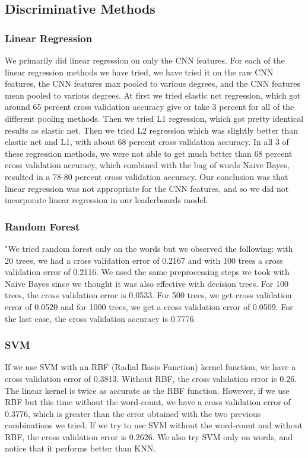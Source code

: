 \documentclass[11pt,twocolumn]{report}
\begin{document}
    
    \subsection*{Discriminative Methods}
    \subsubsection{Linear Regression}
	We primarily did linear regression on only the CNN features. For each of the linear regression methods we have tried, we have tried it on the raw CNN features, the CNN features max pooled to various degrees, and the CNN features mean pooled to various degrees.    
    At first we tried elastic net regression, which got around 65 percent cross validation accuracy give or take 3 percent for all of the different pooling methods. Then we tried L1 regression, which got pretty identical results as elastic net. Then we tried L2 regression which was slightly better than elastic net and L1, with about 68 percent cross validation accuracy. 
    In all 3 of these regression methods, we were not able to get much better than 68 percent cross validation accuracy, which combined with the bag of words Naive Bayes, resulted in a 78-80 percent cross validation accuracy. Our conclusion was that linear regression was not appropriate for the CNN features, and so we did not incorporate linear regression in our leaderboards model. 
    
     \subsubsection{Random Forest}
     "We tried random forest only on the words but we observed the following: with 20 trees, we had a cross validation error of 0.2167 and with 100 trees a cross validation error of 0.2116. We used the same preprocessing steps we took with Naive Bayes since we thought it was also effective with decision trees. 
     For 100 trees, the cross validation error is 0.0533. For 500 trees, we get cross validation error of 0.0520 and for 1000 trees, we get a cross validation error of 0.0509. For the last case, the cross validation accuracy is 0.7776.
    \subsubsection{SVM}
    
    If we use SVM with an RBF (Radial Basis Function) kernel function, we have a cross validation error of 0.3813. Without RBF, the cross validation error is 0.26. The linear kernel is twice as accurate as the RBF function. However, if we use RBF but this time without the word-count, we have a cross validation error of 0.3776, which is greater than the error obtained with the two previous combinations we tried. If we try to use SVM without the word-count and without RBF, the cross validation error is 0.2626. We also try SVM only on words, and notice that it performs better than KNN.
    
\end{document}
